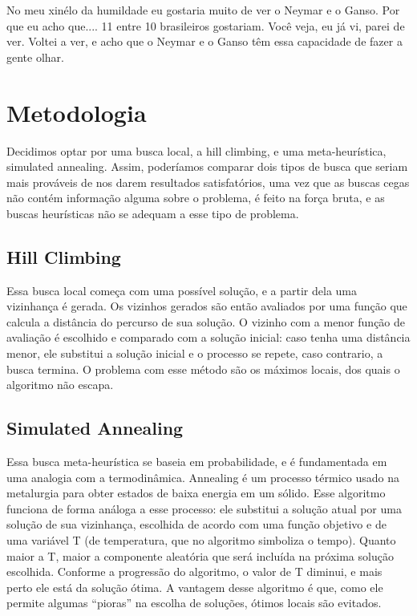 \documentclass[12pt, a4paper]{article}
\begin{document}
		No meu xinélo da humildade eu gostaria muito de ver o Neymar e o Ganso. Por que eu acho que.... 11 entre 10 brasileiros gostariam. Você veja, eu já vi, parei de ver. Voltei a ver, e acho que o Neymar e o Ganso têm essa capacidade de fazer a gente olhar.

\section{Metodologia}
Decidimos optar por uma busca local, a hill climbing, e uma meta-heurística, simulated annealing. Assim, poderíamos comparar dois tipos de busca que seriam mais prováveis de nos darem resultados satisfatórios, uma vez que as buscas cegas não contém informação alguma sobre o problema, é feito na força bruta, e as buscas heurísticas não se adequam a esse tipo de problema.
	
	\subsection{Hill Climbing}
	Essa busca local começa com uma possível solução, e a partir dela uma vizinhança é gerada. Os vizinhos gerados são então avaliados por uma função que calcula a distância do percurso de sua solução. O vizinho com a menor função de avaliação é escolhido e comparado com a solução inicial: caso tenha uma distância menor, ele substitui a solução inicial e o processo se repete, caso contrario, a busca termina. O problema com esse método são os máximos locais, dos quais o algoritmo não escapa. 
	
	\subsection{Simulated Annealing}
	Essa busca meta-heurística se baseia em probabilidade, e é fundamentada em uma analogia com a termodinâmica. Annealing é um processo térmico usado na metalurgia para obter estados de baixa energia em um sólido. Esse algoritmo funciona de forma análoga a esse processo: ele substitui a solução atual por uma solução de sua vizinhança, escolhida de acordo com uma função objetivo e de uma variável T (de temperatura, que no algoritmo simboliza o tempo). Quanto maior a T, maior a componente aleatória que será incluída na próxima solução escolhida. Conforme a progressão do algoritmo, o valor de T diminui, e mais perto ele está da solução ótima. A vantagem desse algoritmo é que, como ele permite algumas “pioras” na escolha de soluções, ótimos locais são evitados.
\end{document}
